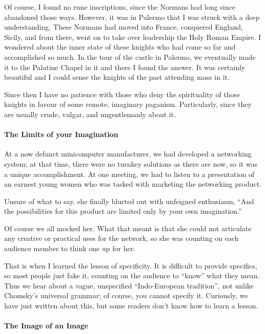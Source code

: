 Of course, I found no rune inscriptions, since the Normans had long since abandoned those ways. However, it was in Palermo that I was struck with a deep understanding. These Normans had moved into France, conquered England, Sicily, and from there, went on to take over leadership the Holy Roman Empire. I wondered about the inner state of these knights who had come so far and accomplished so much. In the tour of the castle in Palermo, we eventually made it to the Palatine Chapel in it and there I found the answer. It was certainly beautiful and I could sense the knights of the past attending mass in it.

Since then I have no patience with those who deny the spirituality of those knights in favour of some remote, imaginary paganism. Particularly, since they are usually crude, vulgar, and ungentlemanly about it.

\paragraph{The Limits of your Imagination}


At a now defunct minicomputer manufacturer, we had developed a networking system; at that time, there were no turnkey solutions as there are now, so it was a unique accomplishment. At one meeting, we had to listen to a presentation of an earnest young women who was tasked with marketing the networking product.

Unsure of what to say, she finally blurted out with unfeigned enthusiasm, ``And the possibilities for this product are limited only by your own imagination.''

Of course we all mocked her. What that meant is that she could not articulate any creative or practical uses for the network, so she was counting on each audience member to think one up for her.

That is when I learned the lesson of specificity. It is difficult to provide specifics, so most people just fake it, counting on the audience to ``know'' what they mean. Thus we hear about a vague, unspecified ``Indo-European tradition'', not unlike Chomsky's universal grammar; of course, you cannot specify it. Curiously, we have just written about this, but some readers don't know how to learn a lesson.

\paragraph{The Image of an Image}


